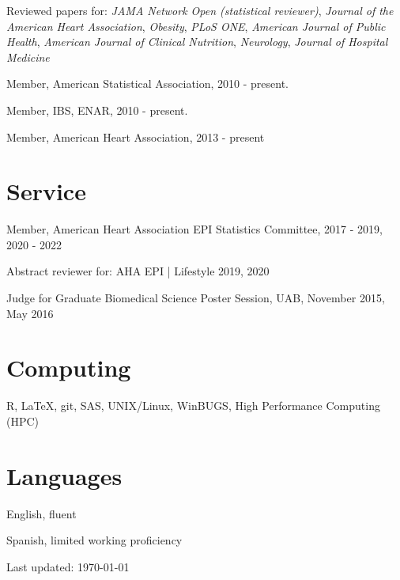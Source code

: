 \documentclass[10pt,letterpaper]{article}
\renewenvironment{itemize}{
  \begin{list}{}{
    \setlength{\leftmargin}{1.5em}
    \setlength{\itemsep}{0.25em}
    \setlength{\parskip}{0pt}
    \setlength{\parsep}{0.25em}
  }
}{
  \end{list}
}
\begin{document}
\begin{itemize}
\item Reviewed papers for: \emph{JAMA Network Open (statistical reviewer)}, \emph{Journal of the American Heart Association}, \emph{Obesity}, \emph{PLoS ONE}, \emph{American Journal of Public Health}, \emph{American Journal of Clinical Nutrition}, \emph{Neurology}, \emph{Journal of Hospital Medicine}
\item Member, American Statistical Association, 2010 - present.
\item Member, IBS, ENAR, 2010 - present.
\item Member, American Heart Association, 2013 - present
\end{itemize}

\section*{Service}
\begin{itemize}
    \item Member, American Heart Association EPI Statistics Committee, 2017 - 2019, 2020 - 2022
    \item Abstract reviewer for: AHA EPI | Lifestyle 2019, 2020
	\item Judge for Graduate Biomedical Science Poster Session, UAB, November 2015, May 2016
\end{itemize}

\section*{Computing}
\begin{itemize}
    \item R, \LaTeX, git, SAS, UNIX/Linux, WinBUGS, High Performance Computing (HPC)
\end{itemize}

\section*{Languages}
\begin{itemize}
	\item English, fluent
	\item Spanish, limited working proficiency
\end{itemize}
\medskip

\begin{center}
  \begin{small}
    Last updated: \today
  \end{small}
\end{center}
\end{document}
